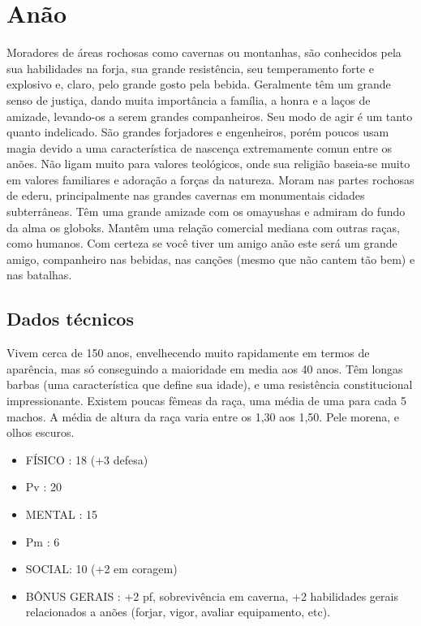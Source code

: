 \section{Anão}

Moradores de áreas rochosas como cavernas ou montanhas, são conhecidos pela sua habilidades na forja, sua grande resistência, seu temperamento forte e explosivo e, claro, pelo grande gosto pela bebida. Geralmente têm um grande senso de justiça, dando muita importância a família, a honra e a laços de amizade, levando-os a serem grandes companheiros. Seu modo de agir é um tanto quanto indelicado. São grandes forjadores e engenheiros, porém poucos usam magia devido a uma característica de nascença extremamente comun entre os anões. Não ligam muito para valores teológicos, onde sua religião baseia-se muito em valores familiares e adoração a forças da natureza. Moram nas partes rochosas de ederu, principalmente nas grandes cavernas em monumentais cidades subterrâneas. Têm uma grande amizade com os omayushas e admiram do fundo da alma os globoks. Mantêm uma relação comercial mediana com outras raças, como humanos. Com certeza se você tiver um amigo anão este será um grande amigo, companheiro nas bebidas, nas canções (mesmo que não cantem tão bem) e nas batalhas.

\subsection{Dados técnicos}

Vivem cerca de 150 anos, envelhecendo muito rapidamente em termos de aparência, mas só conseguindo a maioridade em media aos 40 anos. Têm longas barbas (uma característica que define sua idade), e uma resistência constitucional impressionante. Existem poucas fêmeas da raça, uma média de uma para cada 5 machos. A média de altura da raça varia entre os 1,30 aos 1,50. Pele morena, e olhos escuros. 


\begin{itemize}
	\item FÍSICO : 18 (+3 defesa)
	\item Pv : 20 

	\item MENTAL : 15
	\item Pm : 6

	\item SOCIAL: 10 (+2 em coragem)

	\item BÔNUS GERAIS : +2 pf, sobrevivência em caverna, +2 habilidades gerais relacionados a anões (forjar, vigor, avaliar equipamento, etc).
\end{itemize}

